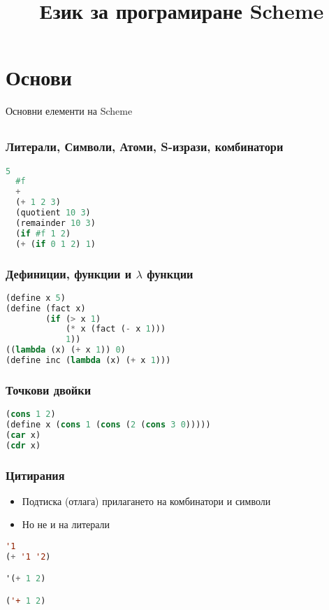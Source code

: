 \documentclass{beamer}
\begin{document}
\title[Scheme]{Език за програмиране Scheme}
\frame{\titlepage}

\section{Основи}

\begin{frame}
  \centerline{Основни елементи на Scheme}
\end{frame}


\subsection{}

\begin{frame}[fragile]
\frametitle{Литерали, Символи, Атоми, S-изрази, комбинатори}

\begin{lstlisting}[basicstyle=\small,language=Lisp]
  5
  #f
  +
  (+ 1 2 3)
  (quotient 10 3)
  (remainder 10 3)
  (if #f 1 2)
  (+ (if 0 1 2) 1)
\end{lstlisting}

\end{frame}


\begin{frame}[fragile]
\frametitle{Дефиниции, функции и $\lambda$ функции}

\begin{lstlisting}[basicstyle=\small,language=Lisp]
(define x 5)
(define (fact x) 
        (if (> x 1) 
            (* x (fact (- x 1))) 
            1))
((lambda (x) (+ x 1)) 0)
(define inc (lambda (x) (+ x 1)))
\end{lstlisting}

\end{frame}


\begin{frame}[fragile]
\frametitle{Точкови двойки}

\begin{lstlisting}[basicstyle=\small,language=Lisp]
(cons 1 2)
(define x (cons 1 (cons (2 (cons 3 0)))))
(car x)
(cdr x)
\end{lstlisting}

\end{frame}

\begin{frame}[fragile]
\frametitle{Цитирания}

\begin{itemize}
  \item Подтиска (отлага) прилагането на комбинатори и символи
  \item Но не и на литерали
\end{itemize}

\begin{lstlisting}[basicstyle=\small,language=Lisp]
'1
(+ '1 '2)

'(+ 1 2)

('+ 1 2)
\end{lstlisting}

\end{frame}
\end{document}
